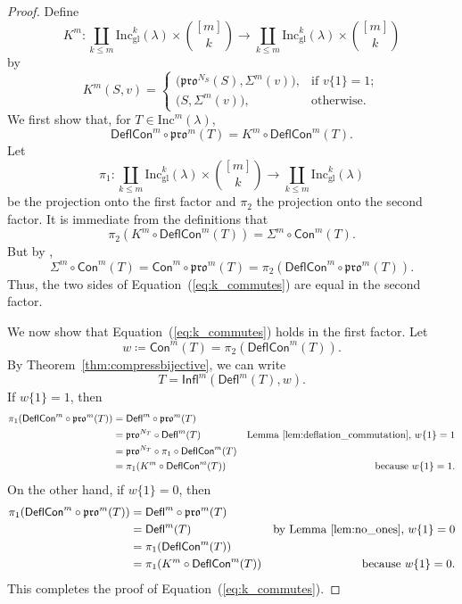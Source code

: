 \documentclass[12pt]{amsart}
\theoremstyle{definition}
\theoremstyle{remark}
\numberwithin{equation}{section}
\newcommand{\inc}{\ensuremath{\mathrm{Inc}}}
\newcommand{\incgl}{\inc_{\mathrm{gl}}}
\newcommand{\pro}{\mathfrak{pro}}
\newcommand{\deflate}{\ensuremath{\mathsf{Defl}}}
\newcommand{\tinflate}{\ensuremath{\mathsf{Infl}}}
\newcommand{\content}{\ensuremath{\mathsf{Con}}}
\newcommand{\compress}{\ensuremath{\mathsf{DeflCon}}}
\begin{document}
  \begin{proof}
Define
  \[
  K^m: \coprod_{k \leq m}\incgl^k(\lambda) \times \binom{[m]}{k} \rightarrow \coprod_{k \leq m}\incgl^k(\lambda) \times \binom{[m]}{k}
  \] by
\[
K^m(S,v) =
\begin{cases}
    \big( \pro^{N_S}(S),\Sigma^m(v) \big),  & \text{if } v\{1\} = 1; \\        
   \big( S,\Sigma^m(v) \big), & \text{otherwise.}
\end{cases}
\]
We first show that, for $T \in \inc^m(\lambda)$,
\begin{equation}\label{eq:k_commutes}
\compress^m \circ \pro^m(T) = K^m \circ \compress^m(T).
\end{equation}
Let \[ \pi_1: \coprod_{k \leq m}\incgl^k(\lambda) \times \binom{[m]}{k} \rightarrow \coprod_{k \leq m} \incgl^k(\lambda) \] be the projection onto the first factor and $\pi_2$ the projection onto the second factor. It is immediate from the definitions that \[ \pi_2(K^m \circ \compress^m(T)) = \Sigma^m \circ \content^m(T).\] But by \cite[Lemma~2.1]{DPS},
\[  \Sigma^m \circ \content^m(T) = \content^m \circ \pro^m(T) = \pi_2(\compress^m \circ \pro^m(T)).\] Thus, the two sides of Equation~(\ref{eq:k_commutes}) are equal in the second factor.  

We now show that Equation~(\ref{eq:k_commutes}) holds in the first factor. Let \[ w \coloneqq \content^m(T) = \pi_2(\compress^m(T)). \]  By Theorem~\ref{thm:compressbijective}, we can write
\[ T = \tinflate^m(\deflate^m(T), w).\] 
If $w\lbrace 1 \rbrace = 1 $, then
\begin{align*}
\pi_1(\compress^m \circ \pro^m(T)) &= \deflate^m \circ \pro^m(T) \\
&= \pro^{N_T} \circ \deflate^m (T) &\text{Lemma~\ref{lem:deflation_commutation}, $w\lbrace 1 \rbrace = 1$} \\
&= \pro^{N_T} \circ \pi_1 \circ \compress^m(T) \\ 
&= \pi_1(K^m \circ \compress^m(T)) &\text{because $w\lbrace 1 \rbrace = 1$.}
\end{align*}
On the other hand, if $w \lbrace 1 \rbrace = 0$, then 
\begin{align*}
\pi_1(\compress^m \circ \pro^m(T)) &= \deflate^m \circ \pro^m(T) \\
&= \deflate^m(T) &\text{by Lemma~\ref{lem:no_ones}, $w \lbrace 1 \rbrace = 0$} \\
&= \pi_1 ( \compress^m(T) ) \\
&= \pi_1 ( K^m \circ \compress^m(T)) &\text{because $w\lbrace 1 \rbrace = 0$.}
\end{align*}
This completes the proof of Equation~(\ref{eq:k_commutes}).


\end{proof}
\end{document}

